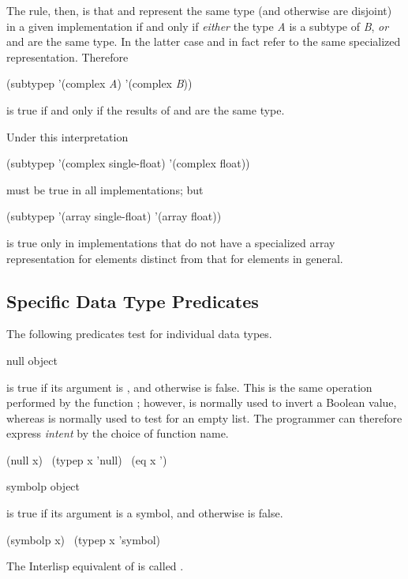 \begin{defun}[Function]
\begin{new}
The rule, then, is that 
and  represent the same type (and otherwise are disjoint)
in a given implementation
if and only if {\it either} the type {\it A} is a subtype of {\it B}, {\it or}
 and
 are the same type.
In the latter case 
and  in fact refer to the same specialized representation.
Therefore
\begin{lisp}
(subtypep '(complex {\it A}) '(complex {\it B}))
\end{lisp}
is true if and only if the results of
 and
 are the same type.

Under this interpretation
\begin{lisp}
(subtypep '(complex single-float) '(complex float))
\end{lisp}
must be true in all implementations; but
\begin{lisp}
(subtypep '(array single-float) '(array float))
\end{lisp}
is true only in implementations that do not have a specialized array representation
for  elements distinct from that for  elements in
general.
\end{new}
\end{defun}

\subsection{Specific Data Type Predicates}

The following predicates test for individual data types.

\begin{defun}[Function]
null object

 is true if its argument is {\empty},
and otherwise is false.
This is the same operation performed by the function ;
however,  is normally used to invert a Boolean value,
whereas  is normally used to test for an empty list.  The programmer
can therefore express {\it intent} by the choice of function name.
\begin{lisp}
(null x) \EQ\ (typep x 'null) \EQ\ (eq x '{\empty})
\end{lisp}
\end{defun}

\begin{defun}[Function]
symbolp object

 is true if its argument is a symbol,
and otherwise is false.
\begin{lisp}
(symbolp x) \EQ\ (typep x 'symbol)
\end{lisp}

\beforenoterule
\begin{incompatibility}
The Interlisp equivalent of  is
called .
\end{incompatibility}
\afternoterule
\end{defun}

